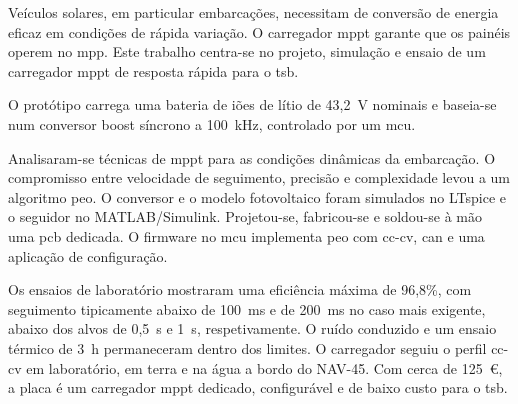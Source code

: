 

\noindent Veículos solares, em particular embarcações, necessitam de conversão de energia eficaz em condições de rápida variação. O carregador \ac{mppt} garante que os painéis operem no \ac{mpp}. Este trabalho centra-se no projeto, simulação e ensaio de um carregador \ac{mppt} de resposta rápida para o \ac{tsb}.

O protótipo carrega uma bateria de iões de lítio de 43,2~V nominais e baseia-se num conversor boost síncrono a 100~kHz, controlado por um \ac{mcu}.

Analisaram-se técnicas de \ac{mppt} para as condições dinâmicas da embarcação. O compromisso entre velocidade de seguimento, precisão e complexidade levou a um algoritmo \ac{peo}. O conversor e o modelo fotovoltaico foram simulados no LTspice e o seguidor no MATLAB/Simulink. Projetou-se, fabricou-se e soldou-se à mão uma \ac{pcb} dedicada. O firmware no \ac{mcu} implementa \ac{peo} com \acs{cc}-\acs{cv}, \acs{can} e uma aplicação de configuração.

Os ensaios de laboratório mostraram uma eficiência máxima de 96,8\%, com seguimento tipicamente abaixo de 100~ms e de 200~ms no caso mais exigente, abaixo dos alvos de 0,5~s e 1~s, respetivamente. O ruído conduzido e um ensaio térmico de 3~h permaneceram dentro dos limites. O carregador seguiu o perfil \acs{cc}-\acs{cv} em laboratório, em terra e na água a bordo do NAV-45. Com cerca de 125~€, a placa é um carregador \ac{mppt} dedicado, configurável e de baixo custo para o \ac{tsb}.

\vspace{0.5cm}
